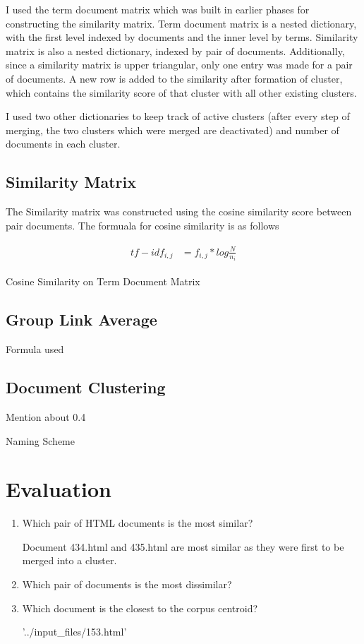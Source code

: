 \documentclass[paper=a4, fontsize=11pt]{scrartcl}
\numberwithin{equation}{section}		%
\numberwithin{figure}{section}			%
\numberwithin{table}{section}				%
\begin{document}
I used the term document matrix which was built in earlier phases for constructing the similarity matrix. Term document matrix is a nested dictionary, with the first level indexed by documents and the inner level by terms. Similarity matrix is also a nested dictionary, indexed by pair of documents. Additionally, since a similarity matrix is upper triangular, only one entry was made for a pair of documents. A new row is added to the similarity after formation of cluster, which contains the similarity score of that cluster with all other existing clusters.

I used two other dictionaries to keep track of active clusters (after every step of merging, the two clusters which were merged are deactivated) and number of documents in each cluster.


\subsection{Similarity Matrix}

The Similarity matrix was constructed using the cosine similarity score between pair documents. The formuala for cosine similarity is as follows

\begin{align} 
	\begin{split}
	tf-idf_{i, j} 	&= f_{i,j} * log\frac{N}{n_{i}}  
	\end{split}					
\end{align}


Cosine Similarity on Term Document Matrix

\subsection{Group Link Average}

Formula used

\subsection{Document Clustering}

Mention about 0.4

Naming Scheme

\section{Evaluation}

\begin{enumerate}
\item Which pair of HTML documents is the most similar? 

Document 434.html and 435.html are most similar as they were first to be merged into a cluster.

\item Which pair of documents is the most dissimilar?
 


\item Which document is the closest to the corpus centroid?

'../input_files/153.html'

\end{enumerate} 
\end{document}
